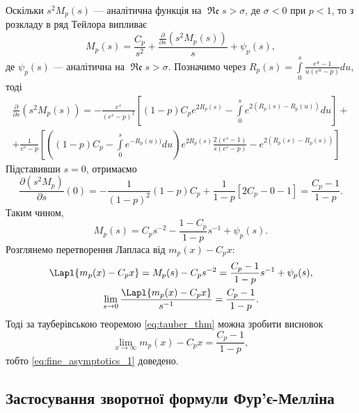 Оскільки $s^2 M_{p}(s)$ --- аналітична функція на $\operatorname{\mathfrak{Re}} s > \sigma$, де $\sigma < 0$ при $p < 1$, то з розкладу в ряд Тейлора випливає
\begin{equation}
M_{p}(s) = \frac{C_{p}}{s^2} + \frac{\frac{\partial}{\partial s}(s^2 M_{p}(s))}{s} + \psi_{p}(s),
\end{equation}
де $\psi_{p}(s)$ --- аналітична на $\operatorname{\mathfrak{Re}} s > \sigma$. Позначимо через $R_{p}(s)=\int\limits_{0}^{s} \frac{e^u -1}{u(e^u - p)} du$, тоді
\begin{gather*}
\frac{\partial}{\partial s}(s^2 M_{p}(s)) = -\frac{e^s}{(e^s - p)^2} \left[(1-p) C_{p} e^{2 R_{p}(s)} - \int\limits_{0}^{s} e^{2(R_{p}(s) - R_{p}(u))} du\right] + \\
+ \frac{1}{e^s - p} \left[ \left((1 - p) C_{p} - \int\limits_{0}^{s} e^{- R_{p}(u))} du\right) e^{2R_{p}(s)} \frac{2(e^s - 1)}{s(e^s - p)} - e^{2(R_{p}(s) - R_{p}(s))} \right] 
\end{gather*}
Підставивши $s = 0$, отримаємо
\begin{equation*}
\frac{\partial (s^2 M_{p})}{\partial s}(0) = -\frac{1}{(1-p)^2} (1-p) C_{p} + \frac{1}{1-p} \left[ 2 C_{p} - 0 - 1 \right] = \frac{C_{p} - 1}{1 - p}.
\end{equation*}
Таким чином,
\begin{equation}
\label{eq:model_laplace_taylor}
M_{p}(s) = C_{p} s^{-2} - \frac{1 - C_{p}}{1 - p} s^{-1} + \psi_{p}(s).
\end{equation}
Розглянемо перетворення Лапласа від $m_{p}(x) - C_{p} x$:
\begin{gather*}
\Lapl{m_{p}(x) - C_{p} x}  = M_{p}(s) - C_{p} s^{-2} =  \frac{C_{p} - 1}{1 - p} s^{-1} + \psi_{p}(s), \\
\lim\limits_{s \rightarrow 0} \frac{\Lapl{m_{p}(x) - C_{p} x}}{s^{-1}} = \frac{C_{p} - 1}{1 - p}.
\end{gather*}
Тоді за тауберівською теоремою \eqref{eq:tauber_thm} можна зробити висновок
\begin{equation}
\lim\limits_{x \rightarrow \infty} m_{p}(x) - C_{p} x = \frac{C_{p} - 1}{1 - p},
\end{equation}
тобто \eqref{eq:fine_asymptotics_1} доведено.

\subsection{Застосування зворотної формули Фур'є-Мелліна}

